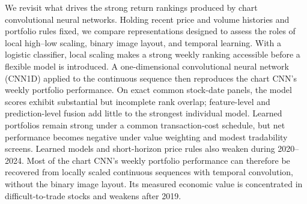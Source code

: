 We revisit what drives the strong return rankings produced by chart convolutional neural networks. Holding recent price and volume histories and portfolio rules fixed, we compare representations designed to assess the roles of local high--low scaling, binary image layout, and temporal learning. With a logistic classifier, local scaling makes a strong weekly ranking accessible before a flexible model is introduced. A one-dimensional convolutional neural network (CNN1D) applied to the continuous sequence then reproduces the chart CNN's weekly portfolio performance. On exact common stock-date panels, the model scores exhibit substantial but incomplete rank overlap; feature-level and prediction-level fusion add little to the strongest individual model. Learned portfolios remain strong under a common transaction-cost schedule, but net performance becomes negative under value weighting and modest tradability screens. Learned models and short-horizon price rules also weaken during 2020--2024. Most of the chart CNN's weekly portfolio performance can therefore be recovered from locally scaled continuous sequences with temporal convolution, without the binary image layout. Its measured economic value is concentrated in difficult-to-trade stocks and weakens after 2019.
